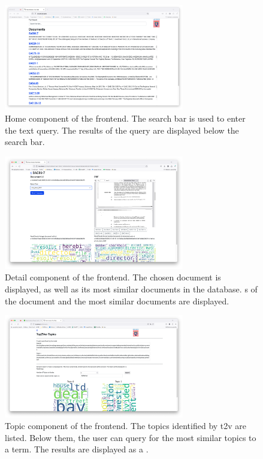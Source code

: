 \begin{figure}[htp] %
    \centering
    \includegraphics[width=0.7\textwidth]{images/UI/Home_component.png}
    \caption[Home component of the frontend]{Home component of the frontend.
    The search bar is used to enter the text query.
    The results of the query are displayed below the search bar.
    }
    \label{fig:home_comp}
\end{figure}


\begin{figure}[htp] %
    \centering
    \includegraphics[width=0.7\textwidth]{images/UI/Home_detail.png}
    \caption[Detail component of the frontend]{Detail component of the frontend.
    The chosen document is displayed, as well as its most similar documents in the database.
    \wordcloud{}s of the document and the most similar documents are displayed.
    }
    \label{fig:detail_comp}
\end{figure}


\begin{figure}[htp] %
    \centering
    \includegraphics[width=0.7\textwidth]{images/UI/Top2Vec_Topics.png}
    \caption[Topic component of the frontend]{Topic component of the frontend.
    The topics identified by \ac{t2v} are listed.
    Below them, the user can query for the most similar topics to a term.
    The results are displayed as a \wordcloud{}.
    }
    \label{fig:top2vec_topic_comp}
\end{figure}


